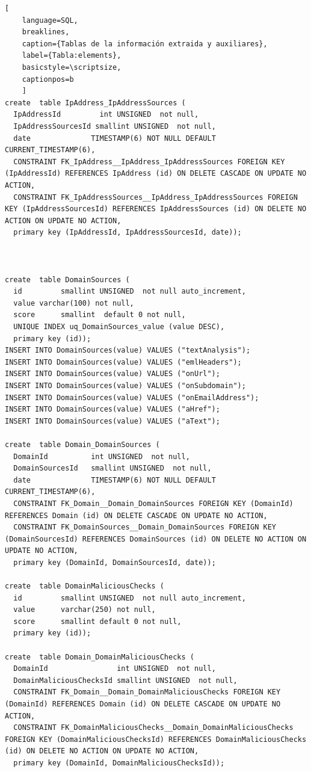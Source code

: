 \begin{lstlisting}[
    language=SQL,
    breaklines, 
    caption={Tablas de la información extraida y auxiliares}, 
    label={Tabla:elements}, 
    basicstyle=\scriptsize,
    captionpos=b
    ]
create  table IpAddress_IpAddressSources (
  IpAddressId         int UNSIGNED  not null, 
  IpAddressSourcesId smallint UNSIGNED  not null,
  date              TIMESTAMP(6) NOT NULL DEFAULT CURRENT_TIMESTAMP(6),
  CONSTRAINT FK_IpAddress__IpAddress_IpAddressSources FOREIGN KEY (IpAddressId) REFERENCES IpAddress (id) ON DELETE CASCADE ON UPDATE NO ACTION,
  CONSTRAINT FK_IpAddressSources__IpAddress_IpAddressSources FOREIGN KEY (IpAddressSourcesId) REFERENCES IpAddressSources (id) ON DELETE NO ACTION ON UPDATE NO ACTION,
  primary key (IpAddressId, IpAddressSourcesId, date));



create  table DomainSources (
  id         smallint UNSIGNED  not null auto_increment, 
  value varchar(100) not null, 
  score      smallint  default 0 not null, 
  UNIQUE INDEX uq_DomainSources_value (value DESC),
  primary key (id));
INSERT INTO DomainSources(value) VALUES ("textAnalysis");
INSERT INTO DomainSources(value) VALUES ("emlHeaders");
INSERT INTO DomainSources(value) VALUES ("onUrl");
INSERT INTO DomainSources(value) VALUES ("onSubdomain");
INSERT INTO DomainSources(value) VALUES ("onEmailAddress");
INSERT INTO DomainSources(value) VALUES ("aHref");
INSERT INTO DomainSources(value) VALUES ("aText");

create  table Domain_DomainSources (
  DomainId          int UNSIGNED  not null, 
  DomainSourcesId   smallint UNSIGNED  not null,
  date              TIMESTAMP(6) NOT NULL DEFAULT CURRENT_TIMESTAMP(6),
  CONSTRAINT FK_Domain__Domain_DomainSources FOREIGN KEY (DomainId) REFERENCES Domain (id) ON DELETE CASCADE ON UPDATE NO ACTION,
  CONSTRAINT FK_DomainSources__Domain_DomainSources FOREIGN KEY (DomainSourcesId) REFERENCES DomainSources (id) ON DELETE NO ACTION ON UPDATE NO ACTION,
  primary key (DomainId, DomainSourcesId, date));

create  table DomainMaliciousChecks (
  id         smallint UNSIGNED  not null auto_increment, 
  value      varchar(250) not null, 
  score      smallint default 0 not null, 
  primary key (id));

create  table Domain_DomainMaliciousChecks (
  DomainId                int UNSIGNED  not null, 
  DomainMaliciousChecksId smallint UNSIGNED  not null,
  CONSTRAINT FK_Domain__Domain_DomainMaliciousChecks FOREIGN KEY (DomainId) REFERENCES Domain (id) ON DELETE CASCADE ON UPDATE NO ACTION,
  CONSTRAINT FK_DomainMaliciousChecks__Domain_DomainMaliciousChecks FOREIGN KEY (DomainMaliciousChecksId) REFERENCES DomainMaliciousChecks (id) ON DELETE NO ACTION ON UPDATE NO ACTION,
  primary key (DomainId, DomainMaliciousChecksId));





\end{lstlisting}
